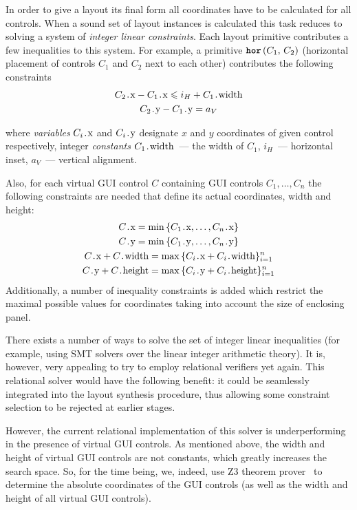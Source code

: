 
In order to give a layout its final form all coordinates have to be calculated for all controls.
When a sound set of layout instances is calculated this task reduces to solving a system of \emph{integer linear constraints}.
Each layout primitive contributes a few inequalities to this system.
For example, a primitive $\mbox{\texttt{\textbf{hor}}}\,(C_1,\,C_2)$ (horizontal placement of controls $C_1$ and $C_2$ next to each other) contributes the following constraints
\begin{gather*}
  C_2\prg{.x} - C_1\prg{.x} \leq i_H + C_1\prg{.width}\\
  C_2\prg{.y} - C_1\prg{.y} = a_V
\end{gather*}

where \emph{variables} $C_i\prg{.x}$ and $C_i\prg{.y}$ designate $x$ and $y$ coordinates of given control respectively, integer
\emph{constants} $C_1\prg{.width}$~--- the width of $C_1$, $i_H$~--- horizontal inset, $a_V$~--- vertical alignment.

Also, for each virtual GUI control $C$ containing GUI controls $C_1, \ldots, C_n$ the following constraints are needed that define
its actual coordinates, width and height:
  \begin{gather*}
    C\prg{.x} = \min\,\{C_1\prg{.x}, \ldots, C_n\prg{.x}\}\\
    C\prg{.y} = \min\,\{C_1\prg{.y}, \ldots, C_n\prg{.y}\}\\
    C\prg{.x} + C\prg{.width} = \max\,\{C_i\prg{.x} + C_i\prg{.width}\}_{i=1}^n\\
    C\prg{.y} + C\prg{.height} = \max\,\{C_i\prg{.y} + C_i\prg{.height}\}_{i=1}^n\\
  \end{gather*}
Additionally, a number of inequality constraints is added which restrict the maximal possible values for
coordinates taking into account the size of enclosing panel.

There exists a number of ways to solve the set of integer linear inequalities (for example, using SMT solvers over the linear
integer arithmetic theory). It is, however, very appealing to try to employ relational verifiers yet again.
This relational solver would have the following benefit: it could be seamlessly integrated into the layout synthesis procedure, thus allowing some
constraint selection to be rejected at earlier stages.

However, the current relational implementation of this solver is underperforming in the presence of virtual GUI controls.
As mentioned above, the width and height of virtual GUI controls are not constants, which greatly increases the
search space. So, for the time being, we, indeed, use \textsc{Z3} theorem prover~\cite{Zthree} to determine the
absolute coordinates of the GUI controls (as well as the width and height of all virtual GUI controls).

